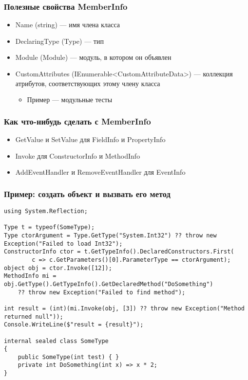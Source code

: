\documentclass{../../slides-style}
\begin{document}
    \begin{frame}
        \frametitle{Полезные свойства MemberInfo}
        \begin{itemize}
            \item Name (string) --- имя члена класса
            \item DeclaringType (Type) --- тип
            \item Module (Module) --- модуль, в котором он объявлен
            \item CustomAttributes (IEnumerable<CustomAttributeData>) --- коллекция атрибутов, соответствующих этому члену класса
            \begin{itemize}
                \item Пример --- модульные тесты
            \end{itemize}
        \end{itemize}
    \end{frame}

    \begin{frame}
        \frametitle{Как что-нибудь сделать с MemberInfo}
        \begin{itemize}
            \item GetValue и SetValue для FieldInfo и PropertyInfo
            \item Invoke для ConstructorInfo и MethodInfo
            \item AddEventHandler и RemoveEventHandler для EventInfo
        \end{itemize}
    \end{frame}

    \begin{frame}[fragile]
        \frametitle{Пример: создать объект и вызвать его метод}
        \begin{scriptsize}
            \begin{verbatim}
using System.Reflection;

Type t = typeof(SomeType);
Type ctorArgument = Type.GetType("System.Int32") ?? throw new Exception("Failed to load Int32");
ConstructorInfo ctor = t.GetTypeInfo().DeclaredConstructors.First(
        c => c.GetParameters()[0].ParameterType == ctorArgument);
object obj = ctor.Invoke([12]);
MethodInfo mi = obj.GetType().GetTypeInfo().GetDeclaredMethod("DoSomething") 
    ?? throw new Exception("Failed to find method");

int result = (int)(mi.Invoke(obj, [3]) ?? throw new Exception("Method returned null"));
Console.WriteLine($"result = {result}");

internal sealed class SomeType
{
    public SomeType(int test) { }
    private int DoSomething(int x) => x * 2;
}
            \end{verbatim}
        \end{scriptsize}
    \end{frame}
\end{document}

